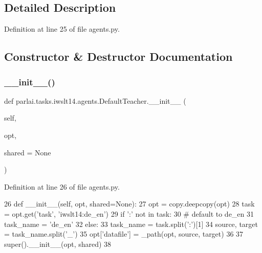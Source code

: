 \subsection{Detailed Description}


Definition at line 25 of file agents.\+py.



\subsection{Constructor \& Destructor Documentation}
\mbox{\label{classparlai_1_1tasks_1_1iwslt14_1_1agents_1_1DefaultTeacher_a7a9bec3db40cf2d087952493dbbae0a0}} 
\subsubsection{\texorpdfstring{\+\_\+\+\_\+init\+\_\+\+\_\+()}{\_\_init\_\_()}}
{\footnotesize\ttfamily def parlai.\+tasks.\+iwslt14.\+agents.\+Default\+Teacher.\+\_\+\+\_\+init\+\_\+\+\_\+ (\begin{DoxyParamCaption}\item[{}]{self,  }\item[{}]{opt,  }\item[{}]{shared = {\ttfamily None} }\end{DoxyParamCaption})}



Definition at line 26 of file agents.\+py.


\begin{DoxyCode}
26     \textcolor{keyword}{def }\_\_init\_\_(self, opt, shared=None):
27         opt = copy.deepcopy(opt)
28         task = opt.get(\textcolor{stringliteral}{'task'}, \textcolor{stringliteral}{'iwslt14:de\_en'})
29         \textcolor{keywordflow}{if} \textcolor{stringliteral}{':'} \textcolor{keywordflow}{not} \textcolor{keywordflow}{in} task:
30             \textcolor{comment}{# default to de\_en}
31             task\_name = \textcolor{stringliteral}{'de\_en'}
32         \textcolor{keywordflow}{else}:
33             task\_name = task.split(\textcolor{stringliteral}{':'})[1]
34         source, target = task\_name.split(\textcolor{stringliteral}{'\_'})
35         opt[\textcolor{stringliteral}{'datafile'}] = \_path(opt, source, target)
36 
37         super().\_\_init\_\_(opt, shared)
38 
\end{DoxyCode}


